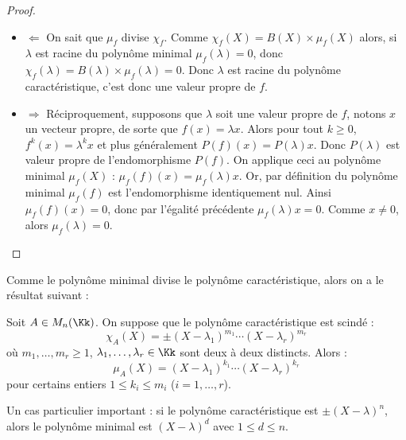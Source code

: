 \documentclass[12pt, class=report,crop=false]{standalone}
\begin{document}
\begin{proof}~
\begin{itemize}
  \item $\Longleftarrow$
On sait que $\mu_f$ divise $\chi_f$. Comme $\chi_f(X) = B(X) \times \mu_f(X)$
alors, si $\lambda$ est racine du polynôme minimal $\mu_f(\lambda) = 0$,
donc $\chi_f(\lambda) = B(\lambda) \times \mu_f(\lambda) = 0$. Donc $\lambda$ est racine du polynôme caractéristique, c'est donc une valeur propre de $f$.


  \item $\Longrightarrow$
Réciproquement, supposons que $\lambda$ soit une valeur propre de $f$, notons $x$ un vecteur propre, 
de sorte que $f(x) = \lambda x$. Alors pour tout $k\ge0$,
$f^k(x) = \lambda^k x$ et plus généralement $P(f)(x) = P(\lambda) x$.
Donc $P(\lambda)$ est valeur propre de l'endomorphisme $P(f)$.
On applique ceci au polynôme minimal $\mu_f(X)$ : 
$\mu_f(f)(x) = \mu_f(\lambda) x$.
Or, par définition du polynôme minimal $\mu_f(f)$ est l'endomorphisme identiquement nul.
Ainsi $\mu_f(f)(x) = 0$, donc par l'égalité précédente $\mu_f(\lambda) x = 0$. Comme $x\neq0$, alors $\mu_f(\lambda)=0$. 

\end{itemize}
\end{proof}



\bigskip



Comme le polynôme minimal divise le polynôme caractéristique, alors on a le résultat suivant :
\begin{lemme}
Soit $A \in M_n(\Kk)$. On suppose que le polynôme caractéristique est scindé :
\[\chi_A(X) = \pm(X-\lambda_1)^{m_1}\cdots(X-\lambda_r)^{m_r}\]
où $m_1,\ldots,m_r \ge 1$, $\lambda_1,\ldots,\lambda_r \in \Kk$ sont deux à deux distincts. Alors :
\[\mu_A(X) = (X-\lambda_1)^{k_1}\cdots(X-\lambda_r)^{k_r}\]
pour certains entiers $1 \le k_i\le m_i$ ($i=1,\ldots,r$). 
\end{lemme}


Un cas particulier important :
si le polynôme caractéristique est $\pm(X-\lambda)^n$, alors le polynôme minimal est
$(X-\lambda)^d$ avec $1 \le d \le n$.
\end{document}
